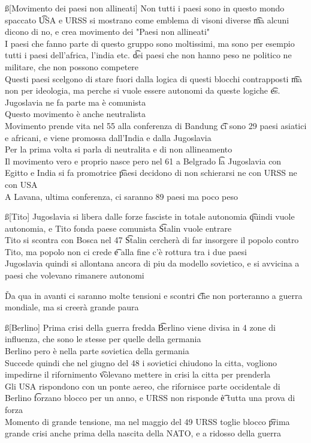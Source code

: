 \documentclass[12pt]{article}
\begin{document}
\ss[Movimento dei paesi non allineati]
Non tutti i paesi sono in questo mondo spaccato \t USA e URSS si mostrano come emblema di visoni diverse \t ma alcuni dicono di no, e crea movimento dei "Paesi non allineati" \\
I paesi che fanno parte di questo gruppo sono moltissimi, ma sono per esempio tutti i paesi dell'africa, l'india etc. \t dei paesi che non hanno peso ne politico ne militare, che non possono competere \\
Questi paesi scelgono di stare fuori dalla logica di questi blocchi contrapposti \t ma non per ideologia, ma perche si vuole essere autonomi da queste logiche \t es. Jugoslavia ne fa parte ma è comunista \\
Questo movimento è anche neutralista \\
Movimento prende vita nel 55 alla conferenza di Bandung \t ci sono 29 paesi asiatici e africani, e viene promossa dall'India e dalla Jugoslavia \\
Per la prima volta si parla di neutralita e di non allineamento \\
Il movimento vero e proprio nasce pero nel 61 a Belgrado \t la Jugoslavia con Egitto e India si fa promotrice \t paesi decidono di non schierarsi ne con URSS ne con USA \\
A Lavana, ultima conferenza, ci saranno 89 paesi ma poco peso

\ss[Tito]
Jugoslavia si libera dalle forze fasciste in totale autonomia \t quindi vuole autonomia, e Tito fonda paese comunista \t Stalin vuole entrare \\
Tito si scontra con Bosca nel 47 \t Stalin cercherà di far insorgere il popolo contro Tito, ma popolo non ci crede \t e alla fine c'è rottura tra i due paesi \\
Jugoslavia quindi si allontana ancora di piu da modello sovietico, e si avvicina a paesi che volevano rimanere autonomi

\v

Da qua in avanti ci saranno molte tensioni e scontri \t che non porteranno a guerra mondiale, ma si creerà grande paura

\ss[Berlino]
Prima crisi della guerra fredda \t Berlino viene divisa in 4 zone di influenza, che sono le stesse per quelle della germania \\
Berlino pero è nella parte sovietica della germania \\
Succede quindi che nel giugno del 48 i sovietici chiudono la citta, vogliono impedirne il rifornimento \t volevano mettere in crisi la citta per prenderla \\
Gli USA rispondono con un ponte aereo, che rifornisce parte occidentale di Berlino \t forzano blocco per un anno, e URSS non risponde \t è tutta una prova di forza \\
Momento di grande tensione, ma nel maggio del 49 URSS toglie blocco \t prima grande crisi anche prima della nascita della NATO, e a ridosso della guerra
\end{document}
